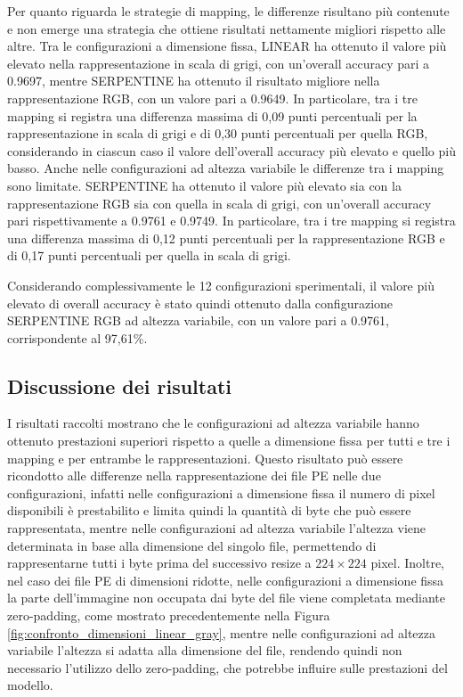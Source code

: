 Per quanto riguarda le strategie di mapping, le differenze risultano
più contenute e non emerge una strategia che ottiene risultati
nettamente migliori rispetto alle altre. Tra le configurazioni a
dimensione fissa, LINEAR ha ottenuto il valore più elevato nella
rappresentazione in scala di grigi, con un'overall accuracy pari a
0.9697, mentre SERPENTINE ha ottenuto il risultato migliore nella
rappresentazione RGB, con un valore pari a 0.9649. In particolare,
tra i tre mapping si registra una differenza massima di 0,09 punti
percentuali per la rappresentazione in scala di grigi e di 0,30
punti percentuali per quella RGB, considerando in ciascun caso il
valore dell'overall accuracy più elevato e quello più basso.
Anche nelle configurazioni ad altezza variabile le differenze tra i
mapping sono limitate. SERPENTINE ha ottenuto il valore più elevato
sia con la rappresentazione RGB sia con quella in scala di grigi,
con un'overall accuracy pari rispettivamente a 0.9761 e 0.9749. In
particolare, tra i tre mapping si registra una differenza massima di
0,12 punti percentuali per la rappresentazione RGB e di 0,17 punti
percentuali per quella in scala di grigi.

Considerando complessivamente le 12 configurazioni sperimentali, il
valore più elevato di overall accuracy è stato quindi ottenuto dalla
configurazione SERPENTINE RGB ad altezza variabile, con un valore
pari a 0.9761, corrispondente al 97,61\%.

\subsection{Discussione dei risultati}

I risultati raccolti mostrano che le configurazioni ad altezza
variabile hanno ottenuto prestazioni superiori rispetto a quelle
a dimensione fissa per tutti e tre i mapping e per entrambe le
rappresentazioni. Questo risultato può essere ricondotto alle
differenze nella rappresentazione dei file PE nelle due configurazioni,
infatti nelle configurazioni a dimensione fissa il numero di pixel
disponibili è prestabilito e limita quindi la quantità di byte che
può essere rappresentata, mentre nelle configurazioni ad altezza
variabile l'altezza viene determinata in base alla dimensione del
singolo file, permettendo di rappresentarne tutti i byte prima del
successivo resize a $224 \times 224$ pixel.
Inoltre, nel caso dei file PE di dimensioni ridotte, nelle
configurazioni a dimensione fissa la parte dell'immagine non occupata
dai byte del file viene completata mediante zero-padding, come
mostrato precedentemente nella Figura
\ref{fig:confronto_dimensioni_linear_gray}, mentre nelle
configurazioni ad altezza variabile l'altezza si adatta alla
dimensione del file, rendendo quindi non necessario l'utilizzo dello zero-padding,
che potrebbe influire sulle prestazioni del modello.

